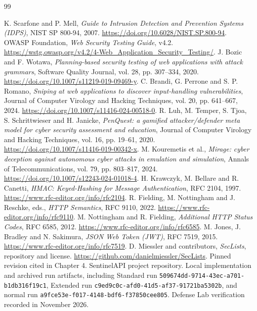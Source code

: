 \documentclass[11pt,a4paper,oneside]{report}
\begin{document}
\renewcommand{\bibname}{References}
\begin{thebibliography}{99}
\small
\raggedright
\setlength{\itemsep}{.5em}
 K. Scarfone and P. Mell, \emph{Guide to Intrusion Detection and Prevention Systems (IDPS)}, NIST SP 800-94, 2007. \url{https://doi.org/10.6028/NIST.SP.800-94}.
 OWASP Foundation, \emph{Web Security Testing Guide}, v4.2. \url{https://wstg.owasp.org/v4.2/4-Web_Application_Security_Testing/}.
 J. Bozic and F. Wotawa, \emph{Planning-based security testing of web applications with attack grammars}, Software Quality Journal, vol. 28, pp. 307--334, 2020. \url{https://doi.org/10.1007/s11219-019-09469-y}.
 C. Brandi, G. Perrone and S. P. Romano, \emph{Sniping at web applications to discover input-handling vulnerabilities}, Journal of Computer Virology and Hacking Techniques, vol. 20, pp. 641--667, 2024. \url{https://doi.org/10.1007/s11416-024-00518-0}.
 R. Luh, M. Temper, S. Tjoa, S. Schrittwieser and H. Janicke, \emph{PenQuest: a gamified attacker/defender meta model for cyber security assessment and education}, Journal of Computer Virology and Hacking Techniques, vol. 16, pp. 19--61, 2020. \url{https://doi.org/10.1007/s11416-019-00342-x}.
 M. Kouremetis et al., \emph{Mirage: cyber deception against autonomous cyber attacks in emulation and simulation}, Annals of Telecommunications, vol. 79, pp. 803--817, 2024. \url{https://doi.org/10.1007/s12243-024-01018-4}.
 H. Krawczyk, M. Bellare and R. Canetti, \emph{HMAC: Keyed-Hashing for Message Authentication}, RFC 2104, 1997. \url{https://www.rfc-editor.org/info/rfc2104}.
 R. Fielding, M. Nottingham and J. Reschke, eds., \emph{HTTP Semantics}, RFC 9110, 2022. \url{https://www.rfc-editor.org/info/rfc9110}.
 M. Nottingham and R. Fielding, \emph{Additional HTTP Status Codes}, RFC 6585, 2012. \url{https://www.rfc-editor.org/info/rfc6585}.
 M. Jones, J. Bradley and N. Sakimura, \emph{JSON Web Token (JWT)}, RFC 7519, 2015. \url{https://www.rfc-editor.org/info/rfc7519}.
 D. Miessler and contributors, \emph{SecLists}, repository and license. \url{https://github.com/danielmiessler/SecLists}. Pinned revision cited in Chapter 4.
 SentinelAPI project repository. Local implementation and archived run artifacts, including Standard run \nolinkurl{509674dd-9714-43ec-a701-b1db316f19c1}, Extended run \nolinkurl{c9ed9c0c-afd0-41d5-af37-91721ba5302b}, and normal run \nolinkurl{a9fce53e-f017-4148-bdf6-f37850cee805}. Defense Lab verification recorded in November 2026.
\end{thebibliography}
\end{document}
